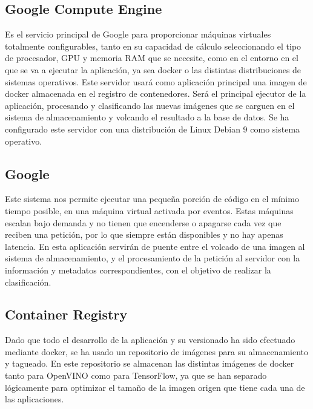 \subsection{Google Compute Engine}\label{subsec:computeengine}
Es el servicio principal de Google para proporcionar máquinas virtuales totalmente configurables, tanto en su capacidad de cálculo seleccionando el tipo de procesador, GPU y memoria RAM que se necesite, como en el entorno
en el que se va a ejecutar la aplicación, ya sea docker\cite{docker} o las distintas distribuciones de sistemas operativos.
Este servidor usará como aplicación principal una imagen de docker almacenada en el registro de contenedores.
Será el principal ejecutor de la aplicación, procesando y clasificando las nuevas imágenes que se carguen en el sistema de almacenamiento y volcando el resultado a la base de datos.
Se ha configurado este servidor con una distribución de Linux\cite{linux} Debian 9 como sistema operativo.
\subsection{Google }\label{subsec:cloudfunction}
Este sistema nos permite ejecutar una pequeña porción de código en el mínimo tiempo posible, en una máquina virtual activada por eventos.
Estas máquinas escalan bajo demanda y no tienen que encenderse o apagarse cada vez que reciben una petición, por lo que siempre están disponibles y no hay apenas latencia.
En esta aplicación servirán de puente entre el volcado de una imagen al sistema de almacenamiento, y el procesamiento de la petición al servidor con la información y metadatos correspondientes, con el objetivo de realizar la clasificación.
\subsection{Container Registry}\label{subsec:container-registry}
Dado que todo el desarrollo de la aplicación y su versionado ha sido efectuado mediante docker, se ha usado un repositorio de imágenes para su almacenamiento y tagueado.
En este repositorio se almacenan las distintas imágenes de docker tanto para OpenVINO como para TensorFlow, ya que se han separado lógicamente para optimizar el tamaño de la imagen origen que tiene cada una de las aplicaciones.

